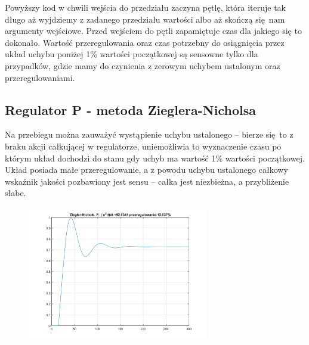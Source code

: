 \documentclass[a4paper, 12pt]{article}
\begin{document}
		\noindent
		Powyższy kod w chwili wejścia do przedziału zaczyna pętlę, która iteruje tak długo aż wyjdziemy z zadanego przedziału wartości albo aż skończą się nam argumenty wejściowe. Przed wejściem do pętli zapamiętuje czas dla jakiego się to dokonało. 
		\newline 
		\newline
		Wartość przeregulowania oraz czas potrzebny do osiągnięcia przez układ uchybu poniżej 1\% wartości początkowej są sensowne tylko dla przypadków, gdzie mamy do czynienia z zerowym uchybem ustalonym oraz przeregulowaniami.
		\newpage
		\noindent
		\subsection{Regulator P - metoda Zieglera-Nicholsa}
			Na przebiegu można zauważyć wystąpienie uchybu ustalonego -- bierze się to z braku akcji całkującej w regulatorze, uniemożliwia to wyznaczenie czasu po którym układ dochodzi do stanu gdy uchyb ma wartość 1\% wartości początkowej. Układ posiada małe przeregulowanie, a z powodu uchybu ustalonego całkowy wskaźnik jakości pozbawiony jest sensu -- całka jest niezbieżna, a przybliżenie słabe.
			\begin{figure}[H]
				\centering
				\includegraphics[width = 0.7\textwidth]{./img/ZN_P.png}
			\end{figure}
\end{document}
